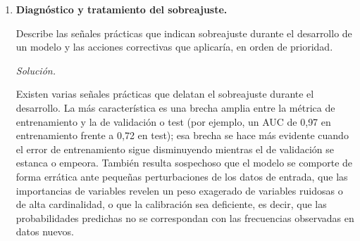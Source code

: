 \documentclass[12pt]{article}
\newcommand\sol[1]{\begin{mdframed}
\emph{Solución.} #1
\end{mdframed}}
\begin{document}
\begin{enumerate}
{Son precisamente esas herramientas de interpretabilidad las que permiten reconciliar ambos extremos.
La importancia de variables por reducción de impureza, nativa de los árboles, da una primera lectura
global de qué variables pesan más, aunque puede sesgarse hacia las de alta cardinalidad. SHAP
(SHapley Additive exPlanations) afina esa lectura: descompone la predicción de cada observación en
contribuciones aditivas de las variables, y proporciona tanto explicaciones globales (importancia
media) como locales (un caso concreto), lo que resulta valioso para justificar decisiones
individuales ante clientes institucionales. LIME aproxima el comportamiento del modelo en el entorno
de una observación mediante un modelo lineal sencillo; es útil para comunicar decisiones puntuales,
si bien sus explicaciones pueden ser inestables. A todo ello se suma la selección de variables, que
al descartar las irrelevantes reduce la superficie que el analista debe explicar y hace más
transparente el modelo resultante.

En un entorno financiero, la combinación de XGBoost o GBM con SHAP permite atender la exigencia de
explicabilidad sin renunciar al rendimiento: el gestor puede mostrar, para cada señal de inversión,
qué variables la impulsan y en qué magnitud, y trasladar esa explicación al lenguaje del negocio (por
ejemplo, que el modelo sobrepondera una acción por la mejora de márgenes y la baja deuda neta).
}

\item \textbf{Diagnóstico y tratamiento del sobreajuste.}

Describe las señales prácticas que indican sobreajuste durante el desarrollo de un modelo y las
acciones correctivas que aplicaría, en orden de prioridad.

\sol{

Existen varias señales prácticas que delatan el sobreajuste durante el desarrollo. La más
característica es una brecha amplia entre la métrica de entrenamiento y la de validación o test
(por ejemplo, un AUC de 0{,}97 en entrenamiento frente a 0{,}72 en test); esa brecha se hace más
evidente cuando el error de entrenamiento sigue disminuyendo mientras el de validación se estanca o
empeora. También resulta sospechoso que el modelo se comporte de forma errática ante pequeñas
perturbaciones de los datos de entrada, que las importancias de variables revelen un peso exagerado
de variables ruidosas o de alta cardinalidad, o que la calibración sea deficiente, es decir, que las
probabilidades predichas no se correspondan con las frecuencias observadas en datos nuevos.

}
\end{enumerate}
\end{document}
